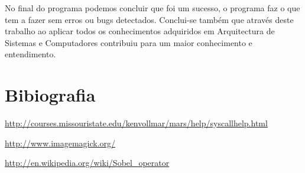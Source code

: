 \documentclass[a4paper,11pt]{article}
\begin{document}
No final do programa podemos concluir que foi um sucesso, o programa faz o que tem a fazer sem erros ou bugs detectados. Conclui-se também que através deste trabalho ao aplicar todos os conhecimentos adquiridos em Arquitectura de Sistemas e Computadores contribuiu para um maior conhecimento e entendimento.

\newpage
\section{Bibiografia}

\newline

\newline
\noindent \href{http://courses.missouristate.edu/kenvollmar/mars/help/syscallhelp.html}{http://courses.missouristate.edu/kenvollmar/mars/help/syscallhelp.html}
\newline

\newline
\noindent \href{http://www.imagemagick.org/}{http://www.imagemagick.org/}
\newline

\newline
\noindent \href{http://en.wikipedia.org/wiki/Sobel_operator}{http://en.wikipedia.org/wiki/Sobel\_operator}
\newline
\end{document}

